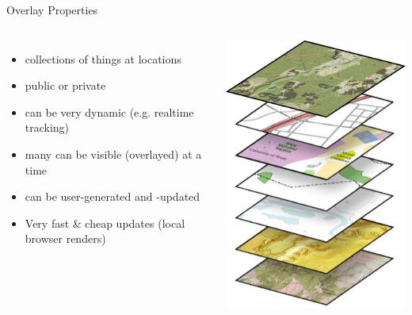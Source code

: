 \documentclass{beamer}
\begin{document}
\begin{frame}{Overlay Properties}
 \begin{columns}
   \begin{itemize}
    \item collections of things at locations
    \item public or private
    \item can be very dynamic (e.g. realtime tracking)
    \item many can be visible (overlayed) at a time
    \item can be user-generated and -updated
    \item Very fast \& cheap updates (local browser renders)
   \end{itemize}
   \includegraphics[scale=0.5]{images/basemap_layers}
 \end{columns}
\end{frame}
\end{document}
